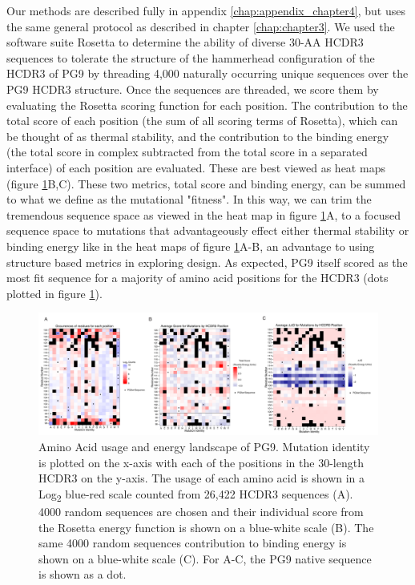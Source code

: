 Our methods are described fully in appendix \ref{chap:appendix_chapter4}, but uses the same general protocol as described in chapter \ref{chap:chapter3}. We used the software suite Rosetta to determine the ability of diverse 30-AA HCDR3 sequences to tolerate the structure of the hammerhead configuration of the HCDR3 of PG9 by threading 4,000 naturally occurring unique sequences over the PG9 HCDR3 structure. Once the sequences are threaded, we score them by evaluating the Rosetta scoring function for each position. The contribution to the total score of each position (the sum of all scoring terms of Rosetta), which can be thought of as thermal stability, and the contribution to the binding energy (the total score in complex subtracted from the total score in a separated interface) of each position are evaluated. These are best viewed as heat maps (figure \ref{fig:figure4_2}B,C). These two metrics, total score and binding energy, can be summed to what we define as the mutational "fitness". In this way, we can trim the tremendous sequence space as viewed in the heat map in figure \ref{fig:figure4_2}A, to a focused sequence space to mutations that advantageously effect either thermal stability or binding energy like in the heat maps of figure \ref{fig:figure4_2}A-B, an advantage to using structure based metrics in exploring design. As expected, PG9 itself scored as the most fit sequence for a majority of amino acid positions for the HCDR3 (dots plotted in figure \ref{fig:figure4_2}). 

\begin{figure}
   \centering
   \includegraphics[width=.99\textwidth]{images/chapter4/figure4_2.pdf} %
   \caption[Amino Acid Usage and Energy Landscape of PG9]{Amino Acid usage and energy landscape of PG9. Mutation identity is plotted on the x-axis with each of the positions in the 30-length HCDR3 on the y-axis. The usage of each amino acid is shown in a Log\textsubscript{2} blue-red scale counted from 26,422 HCDR3 sequences (A). 4000 random sequences are chosen and their individual score from the Rosetta energy function is shown on a blue-white scale (B).  The same 4000 random sequences contribution to binding energy is shown on a blue-white scale (C). For A-C, the PG9 native sequence is shown as a dot.
}
   \label{fig:figure4_2}
\end{figure} 

